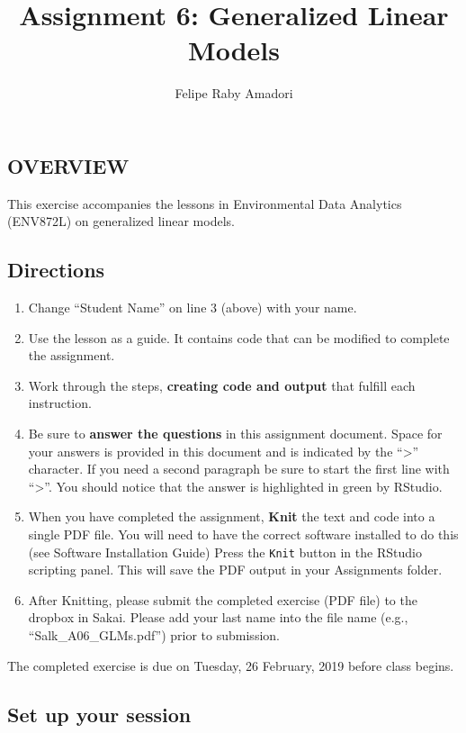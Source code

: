 \documentclass[]{article}
\title{Assignment 6: Generalized Linear Models}
\author{Felipe Raby Amadori}
\date{}
\providecommand{\tightlist}{%
  \setlength{\itemsep}{0pt}\setlength{\parskip}{0pt}}
\begin{document}
\maketitle

\subsection{OVERVIEW}\label{overview}

This exercise accompanies the lessons in Environmental Data Analytics
(ENV872L) on generalized linear models.

\subsection{Directions}\label{directions}

\begin{enumerate}
\def\labelenumi{\arabic{enumi}.}
\tightlist
\item
  Change ``Student Name'' on line 3 (above) with your name.
\item
  Use the lesson as a guide. It contains code that can be modified to
  complete the assignment.
\item
  Work through the steps, \textbf{creating code and output} that fulfill
  each instruction.
\item
  Be sure to \textbf{answer the questions} in this assignment document.
  Space for your answers is provided in this document and is indicated
  by the ``\textgreater{}'' character. If you need a second paragraph be
  sure to start the first line with ``\textgreater{}''. You should
  notice that the answer is highlighted in green by RStudio.
\item
  When you have completed the assignment, \textbf{Knit} the text and
  code into a single PDF file. You will need to have the correct
  software installed to do this (see Software Installation Guide) Press
  the \texttt{Knit} button in the RStudio scripting panel. This will
  save the PDF output in your Assignments folder.
\item
  After Knitting, please submit the completed exercise (PDF file) to the
  dropbox in Sakai. Please add your last name into the file name (e.g.,
  ``Salk\_A06\_GLMs.pdf'') prior to submission.
\end{enumerate}

The completed exercise is due on Tuesday, 26 February, 2019 before class
begins.

\subsection{Set up your session}\label{set-up-your-session}
\end{document}
